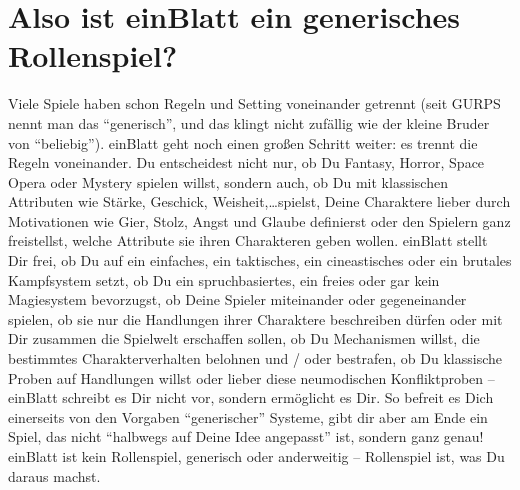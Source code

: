 \section {Also ist einBlatt ein generisches Rollenspiel?}
Viele Spiele haben schon Regeln und Setting voneinander getrennt (seit GURPS nennt man das "`generisch"', und das klingt nicht zufällig wie der kleine Bruder von "`beliebig"'). einBlatt geht noch einen großen Schritt weiter: es trennt die Regeln voneinander. Du entscheidest nicht nur, ob Du Fantasy, Horror, Space Opera oder Mystery spielen willst, sondern auch, ob Du mit klassischen Attributen wie Stärke, Geschick, Weisheit,\dots spielst, Deine Charaktere lieber durch Motivationen wie Gier, Stolz, Angst und Glaube definierst oder den Spielern ganz freistellst, welche Attribute sie ihren Charakteren geben wollen. einBlatt stellt Dir frei, ob Du auf ein einfaches, ein taktisches, ein cineastisches oder ein brutales Kampfsystem setzt, ob Du ein spruchbasiertes, ein freies oder gar kein Magiesystem bevorzugst, ob Deine Spieler miteinander oder gegeneinander spielen, ob sie nur die Handlungen ihrer Charaktere beschreiben dürfen oder mit Dir zusammen die Spielwelt erschaffen sollen, ob Du Mechanismen willst, die bestimmtes Charakterverhalten belohnen und / oder bestrafen, ob Du klassische Proben auf Handlungen willst oder lieber diese neumodischen Konfliktproben -- einBlatt schreibt es Dir nicht vor, sondern ermöglicht es Dir. So befreit es Dich einerseits von den Vorgaben "`generischer"' Systeme, gibt dir aber am Ende ein Spiel, das nicht "`halbwegs auf Deine Idee angepasst"' ist, sondern ganz genau!
\\
einBlatt ist kein Rollenspiel, generisch oder anderweitig -- Rollenspiel ist, was Du daraus machst.

